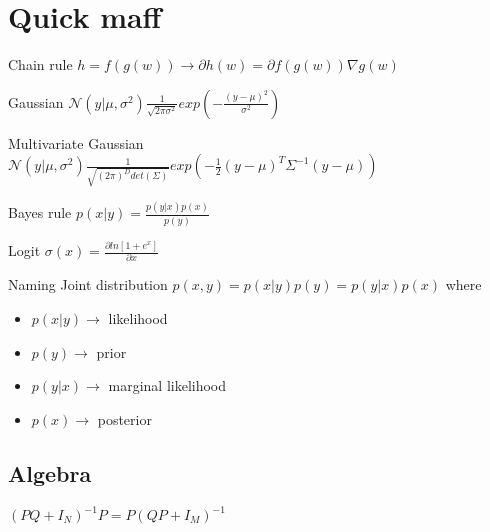 \section{Quick maff}
Chain rule $h = f(g(w)) \rightarrow \partial h(w) = \partial f(g(w)) \nabla g(w)$

Gaussian $\mathcal{N}(y|\mu, \sigma^2) \frac{1}{\sqrt{2\pi \sigma^2}} exp(-\frac{(y-\mu)^2}{\sigma^2})$

Multivariate Gaussian $\mathcal{N}(y|\mu, \sigma^2) \frac{1}{\sqrt{(2\pi)^D det(\Sigma)}} exp(-\frac{1}{2} (y-\mu)^T \Sigma^{-1} (y-\mu))$

Bayes rule $p(x|y) = \frac{p(y|x) p(x)}{p(y)}$

Logit $\sigma(x) = \frac{\partial ln[1+e^x]}{\partial x}$

Naming
Joint distribution $p(x,y) = p(x|y)p(y)=p(y|x)p(x)$ where
\begin{itemize}
\item $p(x|y) \rightarrow$ likelihood 
\item $p(y) \rightarrow$ prior
\item $p(y|x) \rightarrow$ marginal likelihood
\item $p(x) \rightarrow$ posterior
\end{itemize}

\subsection{Algebra}
$(PQ + I_N)^{-1} P = P (QP + I_M)^{-1}$